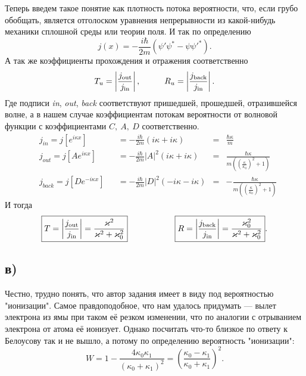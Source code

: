 Теперь введем такое понятие как плотность потока вероятности, что, если грубо обобщать, является отголоском уравнения непрерывности из какой-нибудь механики сплошной среды или теории поля. И так по определению
\begin{equation*}
	j(x) = -\frac{i \hbar}{2 m} (\psi' \psi^* - \psi \psi'^*).
\end{equation*}
А так же коэффициенты прохождения и отражения соответственно
\begin{equation*}
	T_u = \left| \frac{j_\text{out}}{j_\text{in}}\right|,
	\hspace{1 cm}
	R_u = \left| \frac{j_\text{back}}{j_\text{in}}\right|.
\end{equation*}
Где подписи \textit{in}, \textit{out}, \textit{back} соответствуют пришедшей, прошедшей, отразившейся волне, а в нашем случае коэффициентам потокам вероятности от волновой функции с коэффициентами $C,\ A, \ D$ соответственно.
\begin{equation*}
	\begin{aligned}
		&j_\textit{in} = j [e^{i \kappa x}]& &= - \frac{i \hbar}{2 m}(i \kappa + i \kappa) &=& \frac{\hbar \kappa}{m}\\
		&j_\textit{out} = j [A e^{i \kappa x}]& &= - \frac{i \hbar}{2 m}|A|^2(i \kappa + i \kappa) &=& \frac{\hbar \kappa}{m\left(\left(\frac{\kappa}{\kappa_0}\right)^2 + 1\right)}\\
		&j_\textit{back} = j [D e^{-i \kappa x}]& &= - \frac{i \hbar}{2 m} |D|^2( -i \kappa - i \kappa) &=& -\frac{\hbar \kappa}{m\left(\left(\frac{\kappa}{\kappa_0}\right)^2 + 1\right)}
	\end{aligned}
\end{equation*}
И тогда
\begin{equation*}
	\boxed{T = \left|\frac{j_\text{out}}{j_\text{in}}\right| = \frac{\kappa^2}{\kappa^2 + \kappa_0^2}}
	\hspace{2 cm}
	\boxed{R = \left|\frac{j_\text{back}}{j_\text{in}}\right| = \frac{\kappa_0^2}{\kappa^2 + \kappa_0^2}}.
\end{equation*}

\subsection*{в)}
Честно, трудно понять, что автор задания имеет в виду под вероятностью "ионизации". Самое правдоподобное, что нам удалось придумать --- вылет электрона из ямы при таком её резком изменении, что по аналогии с отрыванием электрона от атома её ионизует. Однако посчитать что-то близкое по ответу к Белоусову так и не вышло, а потому по определению вероятность "ионизации":
\begin{equation*}
	W = 1 - \frac{4 \kappa_0 \kappa_1}{(\kappa_0 + \kappa_1)^2} = \left(\frac{\kappa_0 - \kappa_1}{\kappa_0 + \kappa_1}\right)^2.
\end{equation*}